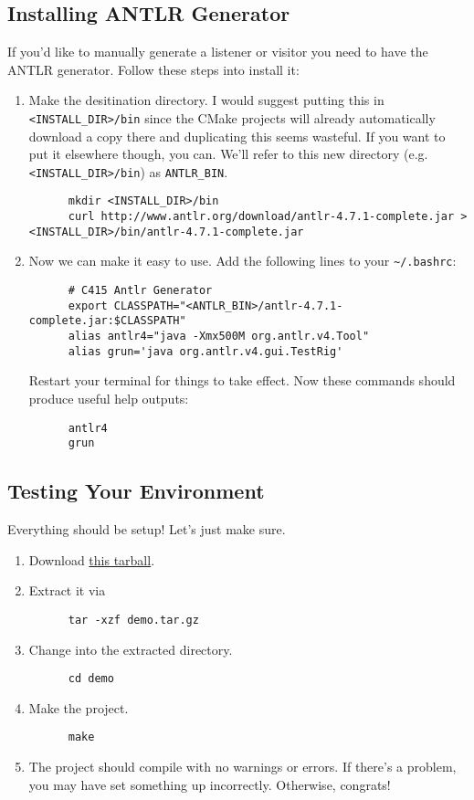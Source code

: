 \documentclass[../setup.tex]{subfiles}
\begin{document}
\subsection{Installing ANTLR Generator}
If you'd like to manually generate a listener or visitor you need to have the ANTLR generator.
Follow these steps into install it:
\begin{enumerate}
  \item
    Make the desitination directory. I would suggest putting this in \lstinline{<INSTALL_DIR>/bin}
    since the CMake projects will already automatically download a copy there and duplicating
    this seems wasteful. If you want to put it elsewhere though, you can. We'll refer to this new
    directory (e.g. \lstinline{<INSTALL_DIR>/bin}) as \lstinline{ANTLR_BIN}.
    \begin{lstlisting}
      mkdir <INSTALL_DIR>/bin
      curl http://www.antlr.org/download/antlr-4.7.1-complete.jar > <INSTALL_DIR>/bin/antlr-4.7.1-complete.jar
    \end{lstlisting}
  \item
    Now we can make it easy to use. Add the following lines to your \lstinline{~/.bashrc}:
    \begin{lstlisting}
      # C415 Antlr Generator
      export CLASSPATH="<ANTLR_BIN>/antlr-4.7.1-complete.jar:$CLASSPATH"
      alias antlr4="java -Xmx500M org.antlr.v4.Tool"
      alias grun='java org.antlr.v4.gui.TestRig'
    \end{lstlisting}
    Restart your terminal for things to take effect. Now these commands should produce useful help
    outputs:
    \begin{lstlisting}
      antlr4
      grun
    \end{lstlisting}
\end{enumerate}

\subsection{Testing Your Environment}
Everything should be setup! Let's just make sure.
\begin{enumerate}
  \item
    Download \href{https://webdocs.cs.ualberta.ca/~c415/setup/static/demo.tar.gz} {this tarball}.
  \item
    Extract it via
    \begin{lstlisting}
      tar -xzf demo.tar.gz
    \end{lstlisting}
  \item
    Change into the extracted directory.
    \begin{lstlisting}
      cd demo
    \end{lstlisting}
  \item
    Make the project.
    \begin{lstlisting}
      make
    \end{lstlisting}
  \item
    The project should compile with no warnings or errors. If there's a problem, you may have set
    something up incorrectly. Otherwise, congrats!
\end{enumerate}
\end{document}
